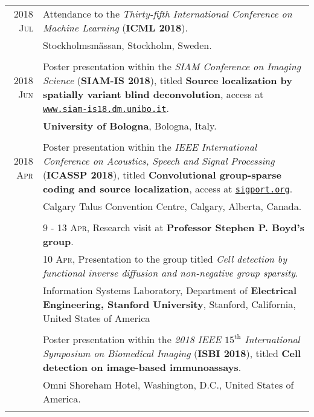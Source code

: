 \documentclass[a4paper,10pt]{article}
\begin{document}
\begin{longtable}[H]{r|p{13.5cm}}
  \textsc{2018 Jul} & Attendance to the \emph{Thirty-fifth International Conference on Machine
                      Learning} (\textbf{ICML 2018}). \\
                  & \footnotesize{Stockholmsm\"{a}ssan, Stockholm, Sweden.} \\
  \multicolumn{2}{c}{} \\

  \textsc{2018 Jun} & Poster presentation within the \emph{SIAM Conference on Imaging Science}
                      (\textbf{SIAM-IS 2018}), titled \textbf{Source localization by spatially
                      variant blind deconvolution}, access at \href{https://www.siam-is18.dm.unibo.it/uploads/store/a7a8b242b168225d0be8998fa373f58b.pdf}{\texttt{www.siam-is18.dm.unibo.it}}. \\
                  & \footnotesize{\textbf{University of Bologna}, Bologna, Italy.}\\
  \multicolumn{2}{c}{} \\

  \textsc{2018 Apr} & Poster presentation within the \emph{IEEE International Conference
                      on Acoustics, Speech and Signal Processing} (\textbf{ICASSP 2018}), titled
                      \textbf{Convolutional group-sparse coding and source localization}, access at \href{https://sigport.org/documents/convolutional-group-sparse-coding-and-source-localization}{\texttt{sigport.org}}. \\
                  & \footnotesize{Calgary Talus Convention Centre, Calgary, Alberta, Canada.} \\
                  & \\
                  & \textsc{9 - 13 Apr}, Research visit at \textbf{Professor Stephen P. Boyd's group}. \\
                  & \textsc{10 Apr}, Presentation to the group titled
                    \emph{Cell detection by functional inverse diffusion and non-negative group sparsity}.\\
                  & \footnotesize{Information Systems Laboratory, Department of \textbf{Electrical Engineering,
                    Stanford University}, Stanford, California, United States of America} \\
                  & \\
                  & Poster presentation within the \emph{2018 IEEE $15^{\mathrm{th}}$ International
                    Symposium on Biomedical Imaging} (\textbf{ISBI 2018}), titled
                    \textbf{Cell detection on image-based immunoassays}.\\
                  & \footnotesize{Omni Shoreham Hotel, Washington, D.C., United States of America.} \\
  \multicolumn{2}{c}{} \\


\end{longtable}
\end{document}
